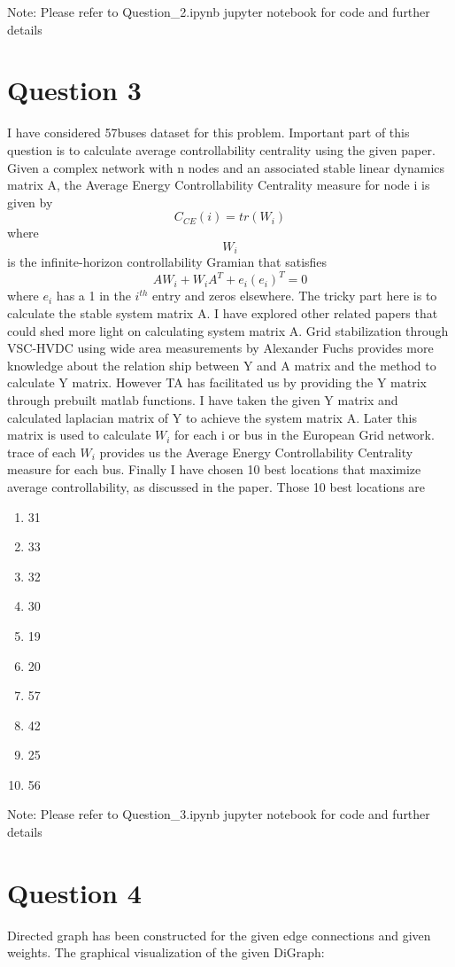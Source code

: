 \documentclass[conference]{IEEEtran}
\begin{document}
\newline
\newline
Note: Please refer to Question\_2.ipynb jupyter notebook for code and further details

\section{Question 3}
I have considered 57buses dataset for this problem. Important part of this question is to calculate average controllability centrality using the given paper. Given a complex network with n nodes and an associated stable linear dynamics matrix A, the Average Energy Controllability Centrality measure for node i is given by
\[ C_{CE}(i) = tr(W_i)\]
where \[W_i\] is the infinite-horizon controllability Gramian that satisfies \[AW_i + W_i A^T + e_i (e_i)^T = 0\]
where $e_i$ has a 1 in the $i^{th}$ entry and zeros elsewhere. The tricky part here is to calculate the stable system matrix A. I have explored other related papers that could shed more light on calculating system matrix A. Grid stabilization through VSC-HVDC using wide area measurements by Alexander Fuchs provides more knowledge about the relation ship between Y and A matrix and the method to calculate Y matrix. However TA has facilitated us by providing the Y matrix through prebuilt matlab functions.
I have taken the given Y matrix and calculated laplacian matrix of Y to achieve the system matrix A. Later this matrix is used to calculate $W_i$ for each i or bus in the European Grid network. trace of each $W_i$ provides us the Average Energy Controllability Centrality measure for each bus. Finally I have chosen 10 best locations that maximize average controllability, as discussed in the paper. Those 10 best locations are
\begin{enumerate}
\item 31
\item 33
\item 32
\item 30
\item 19
\item 20
\item 57
\item 42
\item 25
\item 56
\end{enumerate}


Note: Please refer to Question\_3.ipynb jupyter notebook for code and further details

\section{Question 4}
Directed graph has been constructed for the given edge connections and given weights. The graphical visualization of the given DiGraph:
\end{document}
